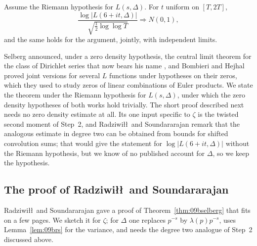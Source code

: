 \begin{theorem}\label{thm:09bselbergdelta}
Assume the Riemann hypothesis for $L(s,\Delta)$. For $t$ uniform on $[T,2T]$,
\[
\frac{\log|L(6+it,\Delta)|}{\sqrt{\frac12\log\log T}}\Longrightarrow N(0,1),
\]
and the same holds for the argument, jointly, with independent limits.
\end{theorem}

Selberg announced, under a zero density hypothesis, the central limit theorem for the class of Dirichlet series that now bears his name \cite{selberg1992}, and Bombieri and Hejhal \cite{bombierihejhal1995} proved joint versions for several $L$ functions under hypotheses on their zeros, which they used to study zeros of linear combinations of Euler products. We state the theorem under the Riemann hypothesis for $L(s,\Delta)$, under which the zero density hypotheses of both works hold trivially. The short proof described next needs no zero density estimate at all. Its one input specific to $\zeta$ is the twisted second moment of Step~2, and Radziwi\l\l\ and Soundararajan remark that the analogous estimate in degree two can be obtained from bounds for shifted convolution sums; that would give the statement for $\log|L(6+it,\Delta)|$ without the Riemann hypothesis, but we know of no published account for $\Delta$, so we keep the hypothesis.

\subsection{The proof of Radziwi\l\l\ and Soundararajan}

Radziwi\l\l\ and Soundararajan \cite{radziwillsound2017} gave a proof of Theorem~\ref{thm:09bselberg} that fits on a few pages. We sketch it for $\zeta$; for $\Delta$ one replaces $p^{-s}$ by $\lambda(p)p^{-s}$, uses Lemma~\ref{lem:09brs} for the variance, and needs the degree two analogue of Step~2 discussed above.


